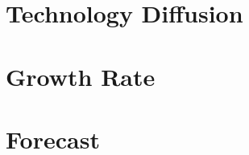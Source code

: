 \documentclass[letterpaper,12pt]{article}
\begin{document}
\section*{Technology Diffusion}

\section*{Growth Rate}

\section*{Forecast}
\end{document}
